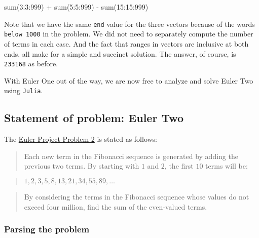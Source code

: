 \documentclass[
  a4paper,
]{article}
\newenvironment{Shaded}{\begin{snugshade}}{\end{snugshade}}
\newcommand{\FloatTok}[1]{\textcolor[rgb]{0.75,0.75,0.82}{#1}}
\newcommand{\FunctionTok}[1]{\textcolor[rgb]{0.94,0.94,0.56}{#1}}
\newcommand{\NormalTok}[1]{\textcolor[rgb]{0.80,0.80,0.80}{#1}}
\newcommand{\OperatorTok}[1]{\textcolor[rgb]{0.94,0.94,0.82}{#1}}
\begin{document}
\begin{Shaded}
\begin{Highlighting}[]
\FunctionTok{sum}\NormalTok{(}\FloatTok{3}\OperatorTok{:}\FloatTok{3}\OperatorTok{:}\FloatTok{999}\NormalTok{) }\OperatorTok{+} \FunctionTok{sum}\NormalTok{(}\FloatTok{5}\OperatorTok{:}\FloatTok{5}\OperatorTok{:}\FloatTok{999}\NormalTok{) }\OperatorTok{{-}} \FunctionTok{sum}\NormalTok{(}\FloatTok{15}\OperatorTok{:}\FloatTok{15}\OperatorTok{:}\FloatTok{999}\NormalTok{)}
\end{Highlighting}
\end{Shaded}

Note that we have the same \texttt{end} value for the three vectors
because of the words \texttt{below\ 1000} in the problem. We did not
need to separately compute the number of terms in each case. And the
fact that ranges in vectors are inclusive at both ends, all make for a
simple and succinct solution. The answer, of course, is \texttt{233168}
as before.

With Euler One out of the way, we are now free to analyze and solve
Euler Two using \texttt{Julia}.

\hypertarget{statement-of-problem-euler-two}{%
\subsection{Statement of problem: Euler
Two}\label{statement-of-problem-euler-two}}

The \href{https://projecteuler.net/problem=2}{Euler Project Problem 2}
is stated as follows:

\begin{quote}
Each new term in the Fibonacci sequence is generated by adding the
previous two terms. By starting with \(1\) and \(2\), the first \(10\)
terms will be:
\end{quote}

\begin{quote}
\(1, 2, 3, 5, 8, 13, 21, 34, 55, 89, \ldots\)
\end{quote}

\begin{quote}
By considering the terms in the Fibonacci sequence whose values do not
exceed four million, find the sum of the even-valued terms.
\end{quote}

\hypertarget{parsing-the-problem}{%
\subsubsection{Parsing the problem}\label{parsing-the-problem}}
\end{document}
